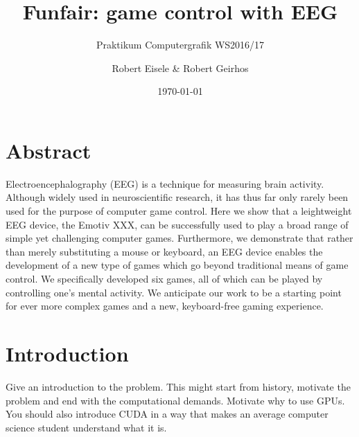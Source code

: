 \documentclass{utue} %
\title{Funfair: game control with EEG}
\author{Robert Eisele \& Robert Geirhos}
\date{\today}
\subtitle{Praktikum Computergrafik WS2016/17}
\begin{document}

\maketitle

\section*{Abstract}

Electroencephalography (EEG) is a technique for measuring brain activity. Although widely used in neuroscientific research, it has thus far only rarely been used for the purpose of computer game control. Here we show that a leightweight EEG device, the Emotiv XXX, can be successfully used to play a broad range of simple yet challenging computer games. Furthermore, we demonstrate that rather than merely substituting a mouse or keyboard, an EEG device enables the development of a new type of games which go beyond traditional means of game control. We specifically developed six games, all of which can be played by controlling one's mental activity. We anticipate our work to be a starting point for ever more complex games and a new, keyboard-free gaming experience.




\section{Introduction}

Give an introduction to the problem. This might start from history, motivate the problem and end with the computational demands. Motivate why to use GPUs. You should also introduce CUDA in a way that makes an average computer science student understand what it is.
\end{document}
